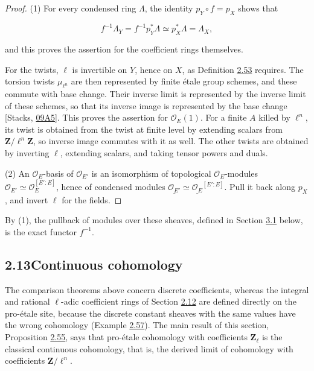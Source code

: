 \documentclass[11pt]{article}
\begin{document}
\begin{proof}[{Proof}]\label{bp168}%
(1) For every condensed ring \(\Lambda\), the identity \(p_Y\circ f=p_X\) shows that

\[
f^{-1}\Lambda_Y=f^{-1}p_Y^*\Lambda\simeq p_X^*\Lambda=\Lambda_X,
\]

and this proves the assertion for the coefficient rings themselves.

For the twists, \(\ell\) is invertible on \(Y\), hence on \(X\), as Definition \hyperref[bp164]{2.53} requires. The torsion twists \(\mu_{\ell^n}\) are then represented by finite étale group schemes, and these commute with base change. Their inverse limit is represented by the inverse limit of these schemes, so that its inverse image is represented by the base change [Stacks, \href{https://stacks.math.columbia.edu/tag/09A5}{09A5}]. This proves the assertion for \(\mathcal O_E(1)\). For a finite \(A\) killed by \(\ell^n\), its twist is obtained from the twist at finite level by extending scalars from \(\mathbf Z/\ell^n\mathbf Z\), so inverse image commutes with it as well. The other twists are obtained by inverting \(\ell\), extending scalars, and taking tensor powers and duals.

(2) An \(\mathcal O_E\)-basis of \(\mathcal O_{E'}\) is an isomorphism of topological \(\mathcal O_E\)-modules \(\mathcal O_{E'}\simeq\mathcal O_E^{[E':E]}\), hence of condensed modules \(\underline{\mathcal O_{E'}}\simeq\underline{\mathcal O_E}^{[E':E]}\). Pull it back along \(p_X\), and invert \(\ell\) for the fields.
\end{proof}

\label{bp169}%
By (1), the pullback of modules over these sheaves, defined in Section \hyperref[bp195]{3.1} below, is the exact functor \(f^{-1}\).



\subsection*{\texorpdfstring{2.13\quad Continuous cohomology}{2.13 Continuous cohomology}}
\label{bp170}%
\label{bp171}%
The comparison theorems above concern discrete coefficients, whereas the integral and rational \(\ell\)-adic coefficient rings of Section \hyperref[bp149]{2.12} are defined directly on the pro-étale site, because the discrete constant sheaves with the same values have the wrong cohomology (Example \hyperref[bp178]{2.57}). The main result of this section, Proposition \hyperref[bp172]{2.55}, says that pro-étale cohomology with coefficients \(\mathbf Z_\ell\) is the classical continuous cohomology, that is, the derived limit of cohomology with coefficients \(\mathbf Z/\ell^n\).
\end{document}
